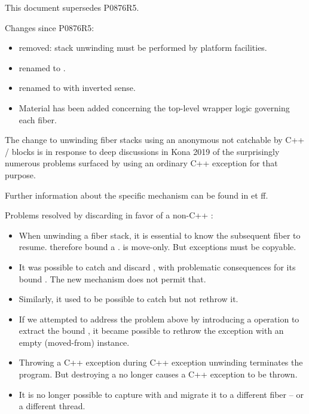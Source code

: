 \label{history}
This document supersedes P0876R5.

Changes since P0876R5:

\begin{itemize}
    \item {} removed: stack unwinding must be
      performed by platform facilities.
    \item {} renamed to
      \canxtresume.
    \item {} renamed to  with inverted
      sense.
    \item Material has been added concerning the top-level wrapper
      logic governing each fiber.
\end{itemize}

The change to unwinding fiber stacks using an anonymous \foreignex not
catchable by C++  /  blocks is in response to deep
discussions in Kona 2019 of the surprisingly numerous problems surfaced by
using an ordinary C++ exception for that purpose.

Further information about the specific mechanism can be found in
 et ff.

Problems resolved by discarding \unwindex in favor of a non-C++ \foreignex:
\begin{itemize}
    \item When unwinding a fiber stack, it is essential to know the subsequent
          fiber to resume. \unwindex therefore bound a \fiber. \fiber is
          move-only. But exceptions must be copyable.
    \item It was possible to catch and discard \unwindex, with problematic
          consequences for its bound \fiber. The new mechanism does not permit
          that.
    \item Similarly, it used to be possible to catch \unwindex but not rethrow it.
    \item If we attempted to address the problem above by introducing a
          \unwindex operation to extract the bound \fiber, it became possible
          to rethrow the exception with an empty (moved-from) \fiber instance.
    \item Throwing a C++ exception during C++ exception unwinding terminates
          the program. But destroying a \fiber no longer causes a C++
          exception to be thrown.
    \item It is no longer possible to capture \unwindex with
           and migrate it to a different fiber -- or
          a different thread.
\end{itemize}

